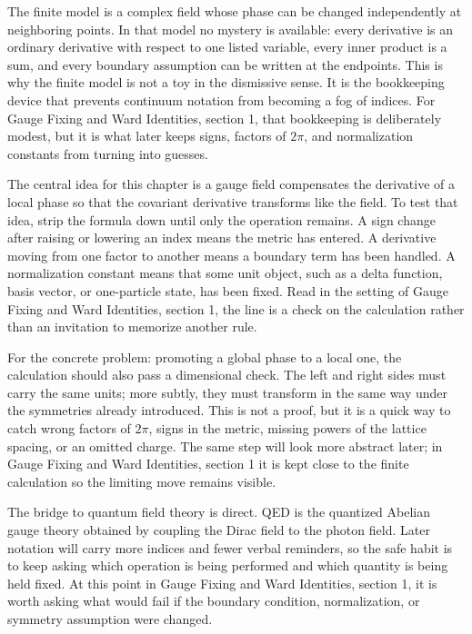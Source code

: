The finite model is a complex field whose phase can be changed independently at neighboring points.  In that model no mystery is available: every derivative is an ordinary derivative with respect to one listed variable, every inner product is a sum, and every boundary assumption can be written at the endpoints.  This is why the finite model is not a toy in the dismissive sense.  It is the bookkeeping device that prevents continuum notation from becoming a fog of indices.  For Gauge Fixing and Ward Identities, section 1, that bookkeeping is deliberately modest, but it is what later keeps signs, factors of \(2\pi\), and normalization constants from turning into guesses.

The central idea for this chapter is a gauge field compensates the derivative of a local phase so that the covariant derivative transforms like the field.  To test that idea, strip the formula down until only the operation remains.  A sign change after raising or lowering an index means the metric has entered.  A derivative moving from one factor to another means a boundary term has been handled.  A normalization constant means that some unit object, such as a delta function, basis vector, or one-particle state, has been fixed.  Read in the setting of Gauge Fixing and Ward Identities, section 1, the line is a check on the calculation rather than an invitation to memorize another rule.

For the concrete problem: promoting a global phase to a local one, the calculation should also pass a dimensional check.  The left and right sides must carry the same units; more subtly, they must transform in the same way under the symmetries already introduced.  This is not a proof, but it is a quick way to catch wrong factors of \(2\pi\), signs in the metric, missing powers of the lattice spacing, or an omitted charge.  The same step will look more abstract later; in Gauge Fixing and Ward Identities, section 1 it is kept close to the finite calculation so the limiting move remains visible.

The bridge to quantum field theory is direct.  QED is the quantized Abelian gauge theory obtained by coupling the Dirac field to the photon field.  Later notation will carry more indices and fewer verbal reminders, so the safe habit is to keep asking which operation is being performed and which quantity is being held fixed.  At this point in Gauge Fixing and Ward Identities, section 1, it is worth asking what would fail if the boundary condition, normalization, or symmetry assumption were changed.

